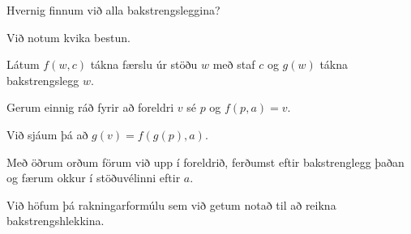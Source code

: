 {
	{
		\item<1-> Hvernig finnum við alla bakstrengsleggina?
		\item<2-> Við notum kvika bestun.
		\item<3-> Látum $f(w, c)$ tákna færslu úr stöðu $w$ með staf $c$ og $g(w)$ tákna bakstrengslegg $w$.
		\item<4-> Gerum einnig ráð fyrir að foreldri $v$ sé $p$ og $f(p, a) = v$.
		\item<5-> Við sjáum þá að $g(v) = f(g(p), a)$.
		\item<6-> Með öðrum orðum förum við upp í foreldrið, ferðumst eftir bakstrenglegg þaðan og færum okkur í stöðuvélinni eftir $a$.
		\item<7-> Við höfum þá rakningarformúlu sem við getum notað til að reikna bakstrengshlekkina.
	}
}

